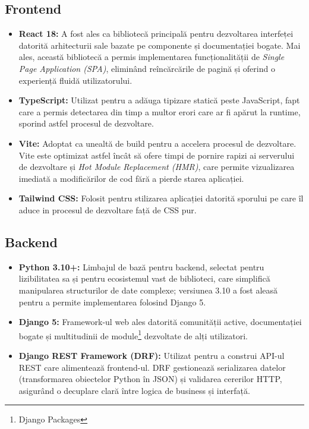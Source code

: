 \documentclass[12pt,a4paper]{article}
\begin{document}
\subsection{Frontend}
\begin{itemize}
    \item \textbf{React 18:} A fost ales ca bibliotecă principală pentru dezvoltarea interfeței datorită arhitecturii sale bazate pe componente și documentației bogate. Mai ales, această bibliotecă a permis implementarea funcționalității de \textit{Single Page Application (SPA)}, eliminând reîncărcările de pagină și oferind o experiență fluidă utilizatorului.
    \item \textbf{TypeScript:} Utilizat pentru a adăuga tipizare statică peste JavaScript, fapt care a permis detectarea din timp a multor erori care ar fi apărut la runtime, sporind astfel procesul de dezvoltare.
    \item \textbf{Vite:} Adoptat ca unealtă de build pentru a accelera procesul de dezvoltare. Vite este optimizat astfel încât să ofere timpi de pornire rapizi ai serverului de dezvoltare și \textit{Hot Module Replacement (HMR)}, care permite vizualizarea imediată a modificărilor de cod fără a pierde starea aplicației.
    \item \textbf{Tailwind CSS:} Folosit pentru stilizarea aplicației datorită sporului pe care îl aduce in procesul de dezvoltare față de CSS pur.
\end{itemize}

\subsection{Backend}
\begin{itemize}
    \item \textbf{Python 3.10+:} Limbajul de bază pentru backend, selectat pentru lizibilitatea sa și pentru ecosistemul vast de biblioteci, care simplifică manipularea structurilor de date complexe; versiunea 3.10 a fost aleasă pentru a permite implementarea folosind Django 5.
    \item \textbf{Django 5:} Framework-ul web ales datorită comunității active, documentației bogate și multitudinii de module\footnote{Django Packages} dezvoltate de alți utilizatori.
    \item \textbf{Django REST Framework (DRF):} Utilizat pentru a construi API-ul REST care alimentează frontend-ul. DRF gestionează serializarea datelor (transformarea obiectelor Python în JSON) și validarea cererilor HTTP, asigurând o decuplare clară între logica de business și interfață.
\end{itemize}
\end{document}

